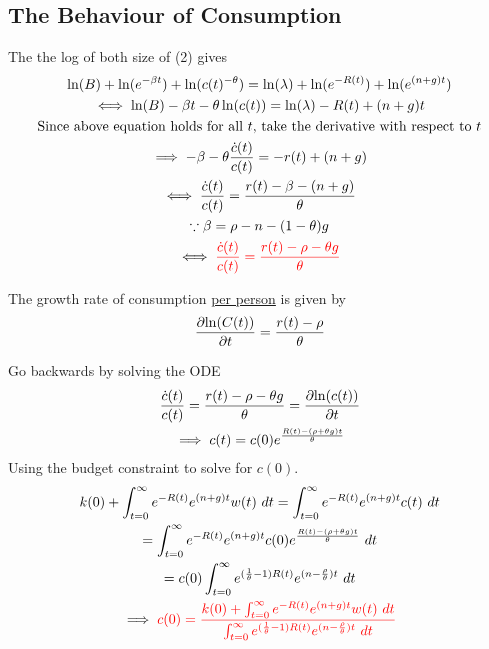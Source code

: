 \documentclass[11pt]{article}
\begin{document}
		\subsection{The Behaviour of Consumption}
			\par The the log of both size of (2) gives 
			\begin{gather}
				\ln(B) + \ln(e^{-\beta t}) + \ln(c(t)^{-\theta}) = \ln(\lambda) + \ln(e^{-R(t)}) + \ln(e^{(n+g)t}) \\
				\iff \ln(B) - \beta t - \theta \ln(c(t)) = \ln(\lambda) - R(t) + (n+g)t \\
				\text{{Since above equation holds for all $t$, take the derivative with respect to $t$}} \\
				\implies -\beta - \theta \frac{\dot{c}(t)}{c(t)} = -r(t) + (n+g) \\
				\iff \frac{\dot{c}(t)}{c(t)} = \frac{r(t) - \beta - (n + g)}{\theta} \\
				\because \beta = \rho - n - (1-\theta) g\\
				\iff 
				\textcolor{red}{
					\frac{\dot{c}(t)}{c(t)} = \frac{r(t) - \rho - \theta g}{\theta}
				}
			\end{gather}
			
			\begin{remark}
				The growth rate of consumption \ul{per person} is given by
				\begin{equation}
					\frac{\partial{\ln(C(t))}}{\partial{t}} = \frac{r(t)-\rho}{\theta}
				\end{equation}
			\end{remark}
			\begin{remark}
				Go backwards by solving the ODE
				\begin{gather}
					\frac{\dot{c}(t)}{c(t)} = \frac{r(t) - \rho - \theta g}{\theta} = \frac{\partial{\ln(c(t))}}{\partial{t}} \\
					\implies c(t) = c(0) e^{\frac{R(t) - (\rho + \theta g)t}{\theta}}
				\end{gather}
				Using the budget constraint to solve for $c(0)$.
				\begin{gather}
					k(0) + \int_{t=0}^\infty {e^{-R(t)} e^{(n+g)t} w(t)\ dt} = \int_{t=0}^\infty {e^{-R(t)} e^{(n+g)t} c(t)\ dt} \\
					= \int_{t=0}^\infty {e^{-R(t)} e^{(n+g)t} c(0) e^{\frac{R(t) - (\rho + \theta g)t}{\theta}}}\ dt \\
					= c(0) \int_{t=0}^\infty e^{(\frac{1}{\theta} - 1)R(t)} e^{(n - \frac{\rho}{\theta})t} \ dt \\
					\implies
					\textcolor{red}{
					c(0) = \frac{
					k(0) + \int_{t=0}^\infty {e^{-R(t)} e^{(n+g)t} w(t)\ dt}
					}{
					\int_{t=0}^\infty e^{(\frac{1}{\theta} - 1)R(t)} e^{(n - \frac{\rho}{\theta})t} \ dt
					}
					}
				\end{gather}
			\end{remark}
\end{document}
